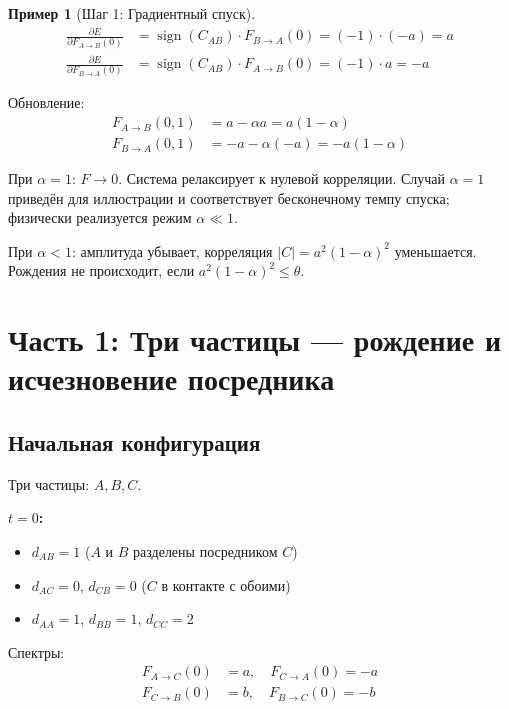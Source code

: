 \documentclass[11pt,a4paper]{article}
\theoremstyle{definition}
\newtheorem{example}{Пример}[section]
\begin{document}
\begin{example}[Шаг 1: Градиентный спуск]
\begin{align}
    \frac{\partial E}{\partial F_{A \to B}(0)} &= \operatorname{sign}(C_{AB}) \cdot F_{B \to A}(0) = (-1) \cdot (-a) = a \\
    \frac{\partial E}{\partial F_{B \to A}(0)} &= \operatorname{sign}(C_{AB}) \cdot F_{A \to B}(0) = (-1) \cdot a = -a
\end{align}

Обновление:
\begin{align}
    F_{A \to B}(0, 1) &= a - \alpha a = a(1 - \alpha) \\
    F_{B \to A}(0, 1) &= -a - \alpha(-a) = -a(1 - \alpha)
\end{align}

При $\alpha = 1$: $F \to 0$. Система релаксирует к нулевой корреляции. Случай $\alpha = 1$ приведён для иллюстрации и соответствует бесконечному темпу спуска; физически реализуется режим $\alpha \ll 1$.

При $\alpha < 1$: амплитуда убывает, корреляция $|C| = a^2(1-\alpha)^2$ уменьшается.
Рождения не происходит, если $a^2(1-\alpha)^2 \leq \theta$.
\end{example}

\newpage
\section{Часть 1: Три частицы --- рождение и исчезновение посредника}

\subsection{Начальная конфигурация}

Три частицы: $A, B, C$.

\textbf{$t = 0$:}
\begin{itemize}
    \item $d_{AB} = 1$ ($A$ и $B$ разделены посредником $C$)
    \item $d_{AC} = 0$, $d_{CB} = 0$ ($C$ в контакте с обоими)
    \item $d_{AA} = 1$, $d_{BB} = 1$, $d_{CC} = 2$
\end{itemize}

Спектры:
\begin{align}
    F_{A \to C}(0) &= a, \quad F_{C \to A}(0) = -a \\
    F_{C \to B}(0) &= b, \quad F_{B \to C}(0) = -b
\end{align}
\end{document}
